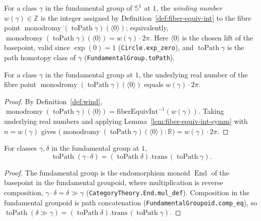 \begin{definition}
    \label{def:wind}
    \leanok
    For a class \(\gamma\) in the fundamental group of \(\mathbb{S}^1\) at \(1\), the
    \emph{winding number} \(w(\gamma) \in \mathbb{Z}\) is the integer assigned by
    Definition~\ref{def:fiber-equiv-int} to the fibre point
    \(\operatorname{monodromy}(\operatorname{toPath}\gamma)(\langle 0\rangle)\); equivalently,
    \(\operatorname{monodromy}(\operatorname{toPath}\gamma)(\langle 0\rangle) = w(\gamma)\cdot 2\pi\).
    Here \(\langle 0\rangle\) is the chosen lift of the basepoint, valid since \(\exp(0) = 1\)
    (\texttt{Circle.exp\_zero}), and \(\operatorname{toPath}\gamma\) is the path homotopy class of
    \(\gamma\) (\texttt{FundamentalGroup.toPath}).
\end{definition}

\begin{lemma}
    \label{lem:wind-spec}
    \leanok
    For a class \(\gamma\) in the fundamental group at \(1\), the underlying real number of the
    fibre point \(\operatorname{monodromy}(\operatorname{toPath}\gamma)(\langle 0\rangle)\) equals
    \(w(\gamma)\cdot 2\pi\).
\end{lemma}
\begin{proof}
    By Definition~\ref{def:wind}, \(\operatorname{monodromy}(\operatorname{toPath}\gamma)(\langle 0\rangle)
      = \mathrm{fiberEquivInt}^{-1}(w(\gamma))\). Taking underlying real numbers and applying
    Lemma~\ref{lem:fiber-equiv-int-symm} with \(n = w(\gamma)\) gives
    \(\bigl(\operatorname{monodromy}(\operatorname{toPath}\gamma)(\langle 0\rangle) : \mathbb{R}\bigr)
      = w(\gamma)\cdot 2\pi\).
\end{proof}

\begin{lemma}
    \label{lem:mul-eq-trans}
    \leanok
    For classes \(\gamma, \delta\) in the fundamental group at \(1\),
    \[
      \operatorname{toPath}(\gamma \cdot \delta)
        = (\operatorname{toPath}\delta).\mathrm{trans}\,(\operatorname{toPath}\gamma).
    \]
\end{lemma}
\begin{proof}
    The fundamental group is the endomorphism monoid \(\operatorname{End}\) of the basepoint in the
    fundamental groupoid, where multiplication is reverse composition,
    \(\gamma \cdot \delta = \delta \mathbin{\gg} \gamma\) (\texttt{CategoryTheory.End.mul\_def}).
    Composition in the fundamental groupoid is path concatenation
    (\texttt{FundamentalGroupoid.comp\_eq}), so
    \(\operatorname{toPath}(\delta \mathbin{\gg} \gamma)
      = (\operatorname{toPath}\delta).\mathrm{trans}\,(\operatorname{toPath}\gamma)\).
\end{proof}

